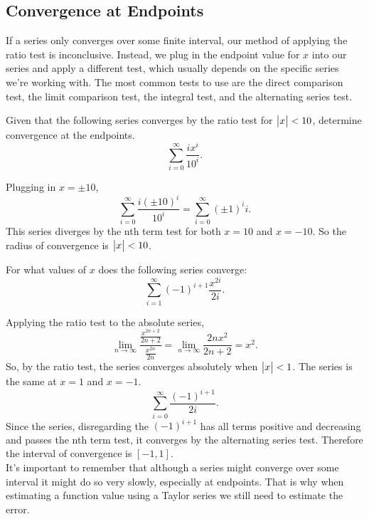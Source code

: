 \subsection{Convergence at Endpoints}
If a series only converges over some finite interval, our method of applying the ratio test is inconclusive.
Instead, we plug in the endpoint value for $x$ into our series and apply a different test, which usually depends on the specific series we're working with.
The most common tests to use are the direct comparison test, the limit comparison test, the integral test, and the alternating series test.

\begin{example}
	Given that the following series converges by the ratio test for $\big\lvert x \big\rvert<10$, determine convergence at the endpoints.
	\begin{equation*}
		\sum_{i=0}^{\infty}{\frac{ix^i}{10^i}}.
	\end{equation*}
\end{example}
Plugging in $x=\pm10$,
\begin{equation*}
	\sum_{i=0}^{\infty}{\frac{i(\pm10)^i}{10^i}} = \sum_{i=0}^{\infty}{(\pm 1)^i i}.
\end{equation*}
\indent
This series diverges by the nth term test for both $x=10$ and $x=-10$.
So the radius of convergence is $\big\lvert x \big\rvert < 10$.

\begin{example}
	For what values of $x$ does the following series converge:
	\begin{equation*}
		\sum_{i=1}^{\infty}{(-1)^{i+1}\frac{x^{2i}}{2i}}.
	\end{equation*}
\end{example}
Applying the ratio test to the absolute series,
\begin{equation*}
	\lim_{n\to\infty}{\frac{\frac{x^{2n+2}}{2n+2}}{\frac{x^{2n}}{2n}}} = \lim_{n\to\infty}{\frac{2nx^2}{2n+2}} = x^2.
\end{equation*}
\indent
So, by the ratio test, the series converges absolutely when $\big\lvert x \big\rvert<1$.
The series is the same at $x=1$ and $x=-1$.
\begin{equation*}
	\sum_{i=0}^{\infty}{\frac{(-1)^{i+1}}{2i}}.
\end{equation*}
\indent
Since the series, disregarding the $(-1)^{i+1}$ has all terms positive and decreasing and passes the nth term test, it converges by the alternating series test.
Therefore the interval of convergence is $[-1,1]$. \\

\noindent
It's important to remember that although a series might converge over some interval it might do so very slowly, especially at endpoints.
That is why when estimating a function value using a Taylor series we still need to estimate the error.